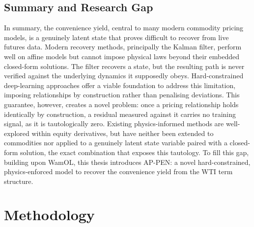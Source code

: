 \documentclass[sigconf, authorversion=true, nonacm=true]{acmart}
\begin{document}
\subsection{Summary and Research Gap}
\label{sec:lit_gap}

In summary, the convenience yield, central to many modern commodity pricing models, is a genuinely latent state that proves difficult to recover from live futures data. Modern recovery methods, principally the Kalman filter, perform well on affine models but cannot impose physical laws beyond their embedded closed-form solutions. The filter recovers a state, but the resulting path is never verified against the underlying dynamics it supposedly obeys. Hard-constrained deep-learning approaches offer a viable foundation to address this limitation, imposing relationships by construction rather than penalising deviations. This guarantee, however, creates a novel problem: once a pricing relationship holds identically by construction, a residual measured against it carries no training signal, as it is tautologically zero. Existing physics-informed methods are well-explored within equity derivatives, but have neither been extended to commodities nor applied to a genuinely latent state variable paired with a closed-form solution, the exact combination that exposes this tautology. To fill this gap, building upon WamOL, this thesis introduces AP-PEN: a novel hard-constrained, physics-enforced model to recover the convenience yield from the WTI term structure.



\section{Methodology}
\label{sec:methodology}
\end{document}
